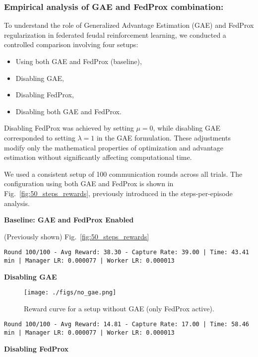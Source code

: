 \documentclass[12pt,a4paper,twoside,openany]{book}
\begin{document}
\subsubsection {Empirical analysis of GAE and FedProx combination:}
To understand the role of Generalized Advantage Estimation (GAE) and FedProx regularization in federated feudal reinforcement learning, we conducted a controlled comparison involving four setups:
\begin{itemize}
    \item Using both GAE and FedProx (baseline),
    \item Disabling GAE,
    \item Disabling FedProx,
    \item Disabling both GAE and FedProx.
\end{itemize}

Disabling FedProx was achieved by setting $\mu=0$, while disabling GAE corresponded to setting $\lambda=1$ in the GAE formulation. These adjustments modify only the mathematical properties of optimization and advantage estimation without significantly affecting computational time.

We used a consistent setup of 100 communication rounds across all trials. The configuration using both GAE and FedProx is shown in Fig.~\ref{fig:50_steps_rewards}, previously introduced in the steps-per-episode analysis.

\textbf{Baseline: GAE and FedProx Enabled}

(Previously shown) Fig.~\ref{fig:50_steps_rewards}

\begin{lstlisting}
Round 100/100 - Avg Reward: 38.30 - Capture Rate: 39.00 | Time: 43.41 min | Manager LR: 0.000077 | Worker LR: 0.000013
\end{lstlisting}

\textbf{Disabling GAE}

\begin{figure}[H]
\centering
\texttt{[image: ./figs/no\_gae.png]}
\captionsetup{font=small}
\caption{Reward curve for a setup without GAE (only FedProx active).}
\label{fig:no_gae}
\end{figure}

\begin{lstlisting}
Round 100/100 - Avg Reward: 14.81 - Capture Rate: 17.00 | Time: 58.46 min | Manager LR: 0.000077 | Worker LR: 0.000013
\end{lstlisting}

\textbf{Disabling FedProx}
\end{document}
